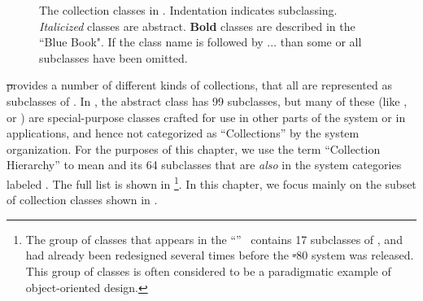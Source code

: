 \documentclass[a4paper,10pt,twoside]{book}
\begin{document}
\begin{figure}
\begin{center}

\caption{The collection classes in \squeak. Indentation indicates subclassing.
\textit{\textsf{Italicized}} classes are abstract.
{\textbf{Bold}} classes are described in the ``Blue Book".
If the class name is followed by ... than some or all subclasses have been omitted.}
\label{fig:CollClassesList}
\end{center}
\end{figure}


\st provides a number of different kinds of collections, that all are represented as subclasses of . In \squeak, the abstract class  has 99 subclasses, but many of these (like \mbox{,} or ) are special-purpose classes crafted for use in other parts of the system or in applications, and hence not categorized as ``Collections'' by the system organization. For the purposes of this chapter, we use the term ``Collection Hierarchy'' to mean  and its 64 subclasses that are \emph{also} in the system categories labeled . The full list is shown in \footnote{The group of classes that appears in the ``''~\cite{Gold83a} contains 17 subclasses of , and had already been redesigned several times before the \st-80 system was released.
This group of classes is often considered to be a paradigmatic example of object-oriented design.}. In this chapter, we focus mainly on the subset of collection classes shown in .
\end{document}
